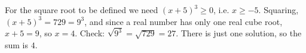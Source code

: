 For the square root to be defined we need $(x+5)^3\ge0$, i.e. $x\ge-5$. Squaring, $(x+5)^3=729=9^3$, and since a real number has only one real cube root, $x+5=9$, so $x=4$. Check: $\sqrt{9^3}=\sqrt{729}=27$. There is just one solution, so the sum is $\boxed{4}$.
